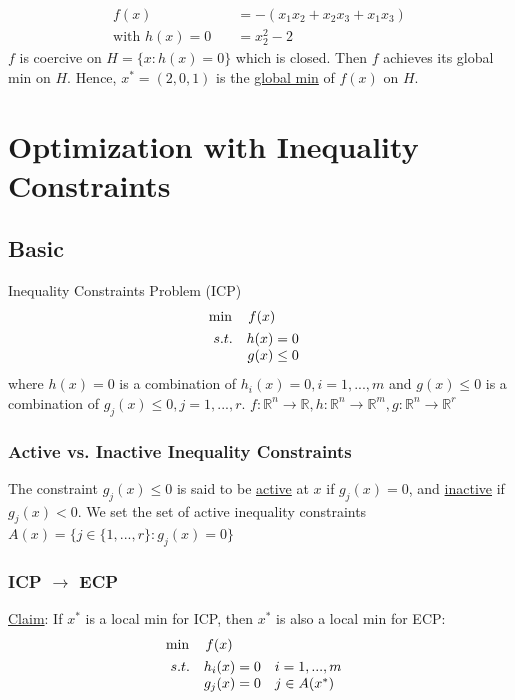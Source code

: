 \documentclass[11pt,a4paper]{article}
\begin{document}
\begin{equation}
    \begin{aligned}
        f(x)&=-(x_1x_2+x_2x_3+x_1x_3)\\
        \text{with }h(x)=0\quad &=x_2^2-2
    \end{aligned}
    \nonumber
\end{equation}
$f$ is coercive on $H=\{x:h(x)=0\}$ which is closed. Then $f$ achieves its global min on $H$. Hence, $x^*=(2,0,1)$ is the \underline{global min} of $f(x)$ on $H$.

\section{Optimization with Inequality Constraints}
\subsection{Basic}
Inequality Constraints Problem (ICP)
\begin{align*}
    &\min\quad f(x)\\
    &\begin{array}{r@{\quad}r@{}l@{\quad}l}
    s.t.
    &h(x)=0&\\
    &g(x)\leq 0&\\
\end{array}
\end{align*}
where $h(x)=0$ is a combination of $h_i(x)=0,i=1,...,m$ and $g(x)\leq 0$ is a combination of $g_j(x)\leq 0,j=1,...,r$. $f:\mathbb{R}^n \rightarrow \mathbb{R}, h:\mathbb{R}^n \rightarrow \mathbb{R}^m, g:\mathbb{R}^n \rightarrow \mathbb{R}^r$

\subsubsection{Active vs. Inactive Inequality Constraints}
The constraint $g_j(x)\leq 0$ is said to be \underline{active} at $x$ if $g_j(x)=0$, and \underline{inactive} if $g_j(x)<0$. We set the set of active inequality constraints $A(x)=\{j\in\{1,...,r\}:g_j(x)=0\}$

\subsubsection{ICP $\rightarrow$ ECP}
\underline{Claim}: If $x^*$ is a local min for ICP, then $x^*$ is also a local min for ECP:
\begin{align*}
    &\min\quad f(x)\\
    &\begin{array}{r@{\quad}r@{}l@{\quad}l}
    s.t.
    &h_i(x)=0\quad&i=1,...,m\\
    &g_j(x)= 0\quad&j\in A(x^*)\\
\end{array}
\end{align*}
\end{document}
